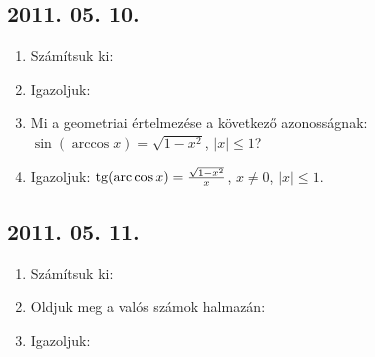 \subsection*{2011. 05. 10.}
\begin{enumerate}
\item Számítsuk ki:
\item Igazoljuk:
\item Mi a geometriai értelmezése a következő azonosságnak: $\sin(\arccos x)=\sqrt{1-x^2}$, $|x|\le1$?
\item Igazoljuk: $\mathop{\mathrm{tg}}\nolimits(\mathop{\mathrm{arc}}\nolimits\cos x)=\frac{\sqrt{1-x^2}}{x}$, $x\ne0$, $|x|\le1$.
\end{enumerate}

\subsection*{2011. 05. 11.}
\begin{enumerate}
\item Számítsuk ki:
\item Oldjuk meg a valós számok halmazán:
\item Igazoljuk:
\end{enumerate}

